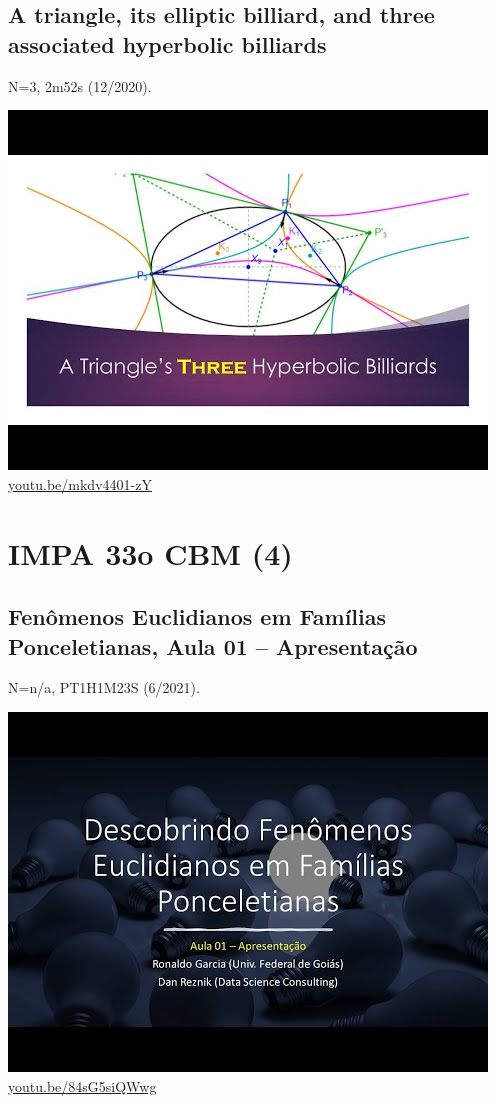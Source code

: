 \documentclass[12pt]{amsart}
\begin{document}
\subsection{A triangle, its elliptic billiard, and three associated hyperbolic billiards}
\label{vid:mkdv4401-zY}
\noindent N=3, 2m52s (12/2020). 
\begin{center}\includegraphics[width=.5\textwidth]{pics/mkdv4401-zY.jpg} \\ 
\href{https://youtu.be/mkdv4401-zY}{\url{youtu.be/mkdv4401-zY}}\end{center}
% 


\section{IMPA 33o CBM (4)}

\subsection{Fenômenos Euclidianos em Famílias Ponceletianas, Aula 01 -- Apresentação}
\label{vid:84sG5siQWwg}
\noindent N=n/a, PT1H1M23S (6/2021). 
\begin{center}\includegraphics[width=.5\textwidth]{pics/84sG5siQWwg.jpg} \\ 
\href{https://youtu.be/84sG5siQWwg}{\url{youtu.be/84sG5siQWwg}}\end{center}
% 
\end{document}
